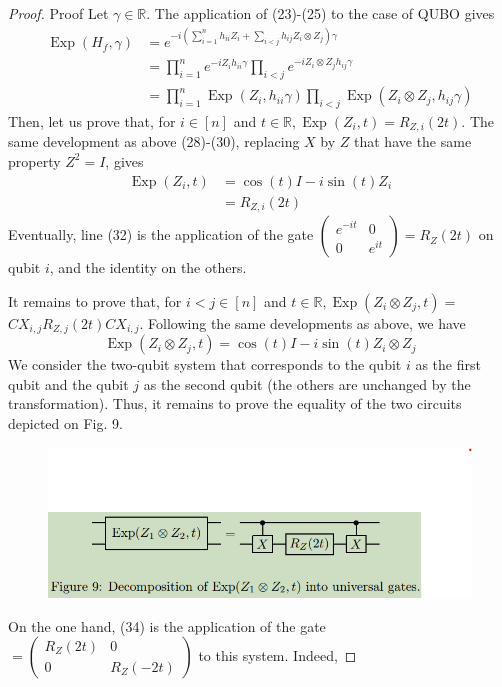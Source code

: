 \begin{proof}
    Proof Let $\gamma \in \mathbb{R}$. The application of (23)-(25) to the case of QUBO gives
\begin{equation}
\begin{aligned}
\operatorname{Exp}\left(H_{f}, \gamma\right) & =e^{-i\left(\sum_{i=1}^{n} h_{i i} Z_{i}+\sum_{i<j} h_{i j} Z_{i} \otimes Z_{j}\right) \gamma} \\
& =\prod_{i=1}^{n} e^{-i Z_{i} h_{i i} \gamma} \prod_{i<j} e^{-i Z_{i} \otimes Z_{j} h_{i j} \gamma} \\
& =\prod_{i=1}^{n} \operatorname{Exp}\left(Z_{i}, h_{i i} \gamma\right) \prod_{i<j} \operatorname{Exp}\left(Z_{i} \otimes Z_{j}, h_{i j} \gamma\right)
\end{aligned}
\end{equation}
Then, let us prove that, for $i \in[n]$ and $t \in \mathbb{R}, \operatorname{Exp}\left(Z_{i}, t\right)=R_{Z, i}(2 t)$. The same development as above (28)-(30), replacing $X$ by $Z$ that have the same property $Z^{2}=I$, gives
\begin{align}
\operatorname{Exp}\left(Z_{i}, t\right) & =\cos (t) I-i \sin (t) Z_{i}  \tag{32}\\
& =R_{Z, i}(2 t) \tag{33}
\end{align}
Eventually, line (32) is the application of the gate $\left(\begin{array}{cc}e^{-i t} & 0 \\ 0 & e^{i t}\end{array}\right)=R_{Z}(2 t)$ on qubit $i$, and the identity on the others.

It remains to prove that, for $i<j \in[n]$ and $t \in \mathbb{R}, \operatorname{Exp}\left(Z_{i} \otimes Z_{j}, t\right)=$ $C X_{i, j} R_{Z, j}(2 t) C X_{i, j}$. Following the same developments as above, we have
\begin{equation}
    \operatorname{Exp}\left(Z_{i} \otimes Z_{j}, t\right)=\cos (t) I-i \sin (t) Z_{i} \otimes Z_{j} \tag{34}
\end{equation}
We consider the two-qubit system that corresponds to the qubit $i$ as the first qubit and the qubit $j$ as the second qubit (the others are unchanged by the transformation). Thus, it remains to prove the equality of the two circuits depicted on Fig. 9.
\begin{figure}[h]
    \centering
    \includegraphics[width=0.75\linewidth]{Images/grange23-f9.png}
\end{figure}
On the one hand, (34) is the application of the gate $=\left(\begin{array}{cc}R_{Z}(2 t) & 0 \\ 0 & R_{Z}(-2 t)\end{array}\right)$ to this system. Indeed,


\end{proof}
